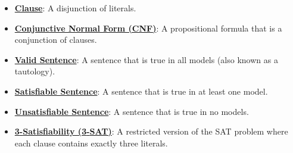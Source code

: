 \documentclass{article}%
\begin{document}
\begin{itemize}[leftmargin=*]
\item \href{https://purdue.brightspace.com/d2l/common/assets/pdfjs-d2l-dist/1.0.14-legacy/web/viewer.html?file=%2Fcontent%2Fenforced%2F1095467-wl.202510.CS.24300.001%2F13L1-Logic.pdf%3Fou%3D1095467&lang=en-us&container=d2l-fileviewer-rendered-pdf&fullscreen=d2l-fileviewer-rendered-pdf-dialog&height=667#page=16}{\textbf{Clause}}: A disjunction of literals.%
\item \href{https://purdue.brightspace.com/d2l/common/assets/pdfjs-d2l-dist/1.0.14-legacy/web/viewer.html?file=%2Fcontent%2Fenforced%2F1095467-wl.202510.CS.24300.001%2F13L1-Logic.pdf%3Fou%3D1095467&lang=en-us&container=d2l-fileviewer-rendered-pdf&fullscreen=d2l-fileviewer-rendered-pdf-dialog&height=667#page=16}{\textbf{Conjunctive Normal Form (CNF)}}: A propositional formula that is a conjunction of clauses.%
\item \href{https://purdue.brightspace.com/d2l/common/assets/pdfjs-d2l-dist/1.0.14-legacy/web/viewer.html?file=%2Fcontent%2Fenforced%2F1095467-wl.202510.CS.24300.001%2F13L1-Logic.pdf%3Fou%3D1095467&lang=en-us&container=d2l-fileviewer-rendered-pdf&fullscreen=d2l-fileviewer-rendered-pdf-dialog&height=667#page=13}{\textbf{Valid Sentence}}: A sentence that is true in all models (also known as a tautology).%
\item \href{https://purdue.brightspace.com/d2l/common/assets/pdfjs-d2l-dist/1.0.14-legacy/web/viewer.html?file=%2Fcontent%2Fenforced%2F1095467-wl.202510.CS.24300.001%2F13L1-Logic.pdf%3Fou%3D1095467&lang=en-us&container=d2l-fileviewer-rendered-pdf&fullscreen=d2l-fileviewer-rendered-pdf-dialog&height=667#page=13}{\textbf{Satisfiable Sentence}}: A sentence that is true in at least one model.%
\item \href{https://purdue.brightspace.com/d2l/common/assets/pdfjs-d2l-dist/1.0.14-legacy/web/viewer.html?file=%2Fcontent%2Fenforced%2F1095467-wl.202510.CS.24300.001%2F13L1-Logic.pdf%3Fou%3D1095467&lang=en-us&container=d2l-fileviewer-rendered-pdf&fullscreen=d2l-fileviewer-rendered-pdf-dialog&height=667#page=13}{\textbf{Unsatisfiable Sentence}}: A sentence that is true in no models.%
\item \href{https://purdue.brightspace.com/d2l/common/assets/pdfjs-d2l-dist/1.0.14-legacy/web/viewer.html?file=%2Fcontent%2Fenforced%2F1095467-wl.202510.CS.24300.001%2F13L1-Logic.pdf%3Fou%3D1095467&lang=en-us&container=d2l-fileviewer-rendered-pdf&fullscreen=d2l-fileviewer-rendered-pdf-dialog&height=667#page=24}{\textbf{3{-}Satisfiability (3{-}SAT)}}: A restricted version of the SAT problem where each clause contains exactly three literals.%

\end{itemize}
\end{document}
